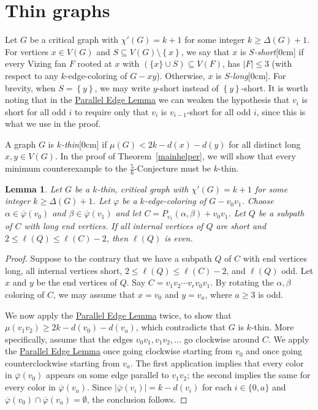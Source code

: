 \documentclass[12pt]{article}
\newcommand{\aside}[1]{\marginnote{\scriptsize{#1}}[0cm]}
\theoremstyle{plain}
\newtheorem{lem}[thm]{Lemma}
\theoremstyle{definition}
\theoremstyle{remark}
\newcommand{\set}[1]{\left\{ #1 \right\}}
\newcommand{\card}[1]{\left|#1\right|}
\newcommand{\vph}{\varphi}
\newcommand{\vphn}{\overline{\varphi}}
\begin{document}
\section{Thin graphs}
\label{sec:thin}
Let $G$ be a critical graph with $\chi'(G) = k+1$ for some integer $k \ge \Delta(G) + 1$.
For vertices $x \in V(G)$ and $S \subseteq V(G) \setminus \set{x}$, we say that
$x$ is \emph{$S$-short}\aside{$S$-short} if every Vizing fan $F$ rooted at $x$
with $(\{x\}\cup S) \subseteq V(F)$, has $\card{F} \le 3$ (with respect to any
$k$-edge-coloring of $G-xy$).  Otherwise, $x$ is
\emph{$S$-long}\aside{$S$-long}.  For brevity,
when $S = \set{y}$, we may write $y$-short instead of $\set{y}$-short.  It is
worth noting that in the \hyperref[SpecialPath]{Parallel Edge Lemma} we can
weaken the hypothesis that $v_i$ is short for all odd $i$ to require only that
$v_i$ is $v_{i-1}$-short for all odd $i$, since this is what we use in the proof.  

A graph $G$ is \emph{$k$-thin}\aside{$k$-thin} if $\mu(G) < 2k - d(x) - d(y)$
for all distinct long $x,y \in V(G)$.  In the proof of
Theorem~\ref{mainhelper}, we will show that every minimum counterexample to
the $\frac56$-Conjecture must be $k$-thin.

\begin{lem}
\label{NonSpecialsInThinAreAtEvenDistance}
Let $G$ be a $k$-thin, critical graph with $\chi'(G) = k+1$ for some integer $k \ge \Delta(G) + 1$.
Let $\vph$ be a $k$-edge-coloring of $G-v_0v_1$. Choose $\alpha \in \vphn(v_0)$
and $\beta \in \vphn(v_1)$ and let $C = P_{v_1}(\alpha, \beta) + v_0v_1$.
Let $Q$ be a subpath of $C$ with long end vertices.  If all internal vertices
of $Q$ are short and $2 \le \ell(Q) \le \ell(C) - 2$, then $\ell(Q)$ is even.
\end{lem}
\begin{proof}
Suppose to the contrary that we have a subpath $Q$ of $C$ with end vertices
long, all internal vertices short, $2\le \ell(Q) \le \ell(C) - 2$,
and $\ell(Q)$ odd.  Let $x$ and $y$ be the end vertices of $Q$.
Say $C = v_1v_2\cdots v_rv_0v_1$.  By rotating the $\alpha,\beta$ coloring of
$C$, we may assume that $x = v_0$ and $y = v_a$, where $a \ge 3$ is odd.

We now apply the \hyperref[SpecialPath]{Parallel Edge Lemma} twice, to show that $\mu(v_1v_2) \ge 2k -
d(v_0) - d(v_a)$, which contradicts that $G$ is $k$-thin.  More specifically,
assume that the edges $v_0v_1,v_1v_2,\ldots$ go clockwise around $C$.  We apply
the \hyperref[SpecialPath]{Parallel Edge Lemma} once going clockwise starting from $v_0$ and once going
counterclockwise starting from $v_a$.  The first application implies that every
color in $\vphn(v_0)$ appears on some edge parallel to $v_1v_2$; the second
implies the same for every color in $\vphn(v_a)$.  Since $\card{\vphn(v_i)}=k-d(v_i)$
for each $i\in\{0,a\}$ and $\vphn(v_0)\cap \vphn(v_a)=\emptyset$, the conclusion
follows.
\end{proof}
\end{document}

